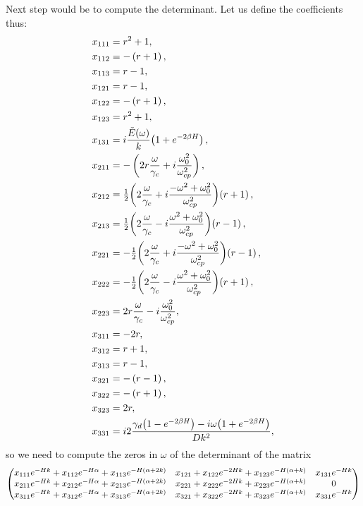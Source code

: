 \documentclass[reqno]{amsart}
\numberwithin{equation}{section}
\numberwithin{figure}{section}
\begin{document}
Next step would be to compute the determinant. Let us define the coefficients thus:
\begin{align*}
x_{111} &= r^{2}+1, \\
x_{112} &= -\left(r+1\right), \\
x_{113} &= r-1, \\
x_{121} &= r-1, \\
x_{122} &= -\left(r+1\right), \\
x_{123} &= r^{2}+1, \\
x_{131} &= i\frac{\tilde{E}\!\left(\omega\right)}{k}\!\left(1+e^{-2\beta \aHeight}\right), \\
x_{211} &= -\left(2r\frac{\omega}{\gamma_{c}}+i\frac{\omega_{0}^{2}}{\omega_{cp}^{2}}\right), \\
x_{212} &= \tfrac{1}{2}\!\left(2\frac{\omega}{\gamma_{c}}+i\frac{-\omega^{2}+\omega_{0}^{2}}{\omega_{cp}^{2}}\right)\!\left(r+1\right), \\
x_{213} &= \tfrac{1}{2}\!\left(2\frac{\omega}{\gamma_{c}}-i\frac{\omega^{2}+\omega_{0}^{2}}{\omega_{cp}^{2}}\right)\!\left(r-1\right), \\
x_{221} &= -\tfrac{1}{2}\!\left(2\frac{\omega}{\gamma_{c}}+i\frac{-\omega^{2}+\omega_{0}^{2}}{\omega_{cp}^{2}}\right)\!\left(r-1\right), \\
x_{222} &= -\tfrac{1}{2}\!\left(2\frac{\omega}{\gamma_{c}}-i\frac{\omega^{2}+\omega_{0}^{2}}{\omega_{cp}^{2}}\right)\!\left(r+1\right), \\
x_{223} &= 2r\frac{\omega}{\gamma_{c}}-i\frac{\omega_{0}^{2}}{\omega_{cp}^{2}}, \\
x_{311} &= -2r, \\
x_{312} &= r+1, \\
x_{313} &= r-1, \\
x_{321} &= -\left(r-1\right), \\
x_{322} &= -\left(r+1\right), \\
x_{323} &= 2r, \\
x_{331} &= i2\frac{\gamma_{d}\!\left(1-e^{-2\beta \aHeight}\right)-i\omega\!\left(1+e^{-2\beta \aHeight}\right)}{Dk^{2}},
\end{align*}
so we need to compute the zeros in $\omega$ of the determinant of the matrix
\begin{equation*}
\begin{pmatrix}
x_{111}e^{-H k}+x_{112}e^{-H\alpha}+x_{113}e^{-H\left(\alpha+2k\right)} & x_{121}+x_{122}e^{-2H k}+x_{123}e^{-H\left(\alpha+k\right)} & x_{131}e^{-H k}\\
x_{211}e^{-H k}+x_{212}e^{-H\alpha}+x_{213}e^{-H\left(\alpha+2k\right)} & x_{221}+x_{222}e^{-2H k}+x_{223}e^{-H\left(\alpha+k\right)} & 0\\
x_{311}e^{-H k}+x_{312}e^{-H\alpha}+x_{313}e^{-H\left(\alpha+2k\right)} & x_{321}+x_{322}e^{-2H k}+x_{323}e^{-H\left(\alpha+k\right)} & x_{331}e^{-H k}
\end{pmatrix}
\end{equation*}
\end{document}

